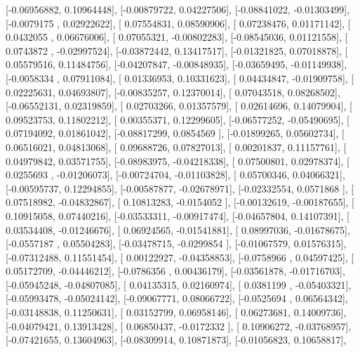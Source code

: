 \documentclass{article}
\begin{document}
       [-0.06956882,  0.10964448],
       [-0.00879722,  0.04227506],
       [-0.08841022, -0.01303499],
       [-0.0079175 ,  0.02922622],
       [ 0.07554831,  0.08590906],
       [ 0.07238476,  0.01171142],
       [ 0.0432055 ,  0.06676006],
       [ 0.07055321, -0.00802283],
       [-0.08545036,  0.01121558],
       [ 0.0743872 , -0.02997524],
       [-0.03872442,  0.13417517],
       [-0.01321825,  0.07018878],
       [ 0.05579516,  0.11484756],
       [-0.04207847, -0.00848935],
       [-0.03659495, -0.01149938],
       [-0.0058334 ,  0.07911084],
       [ 0.01336953,  0.10331623],
       [ 0.04434847, -0.01909758],
       [ 0.02225631,  0.04693807],
       [-0.00835257,  0.12370014],
       [ 0.07043518,  0.08268502],
       [-0.06552131,  0.02319859],
       [ 0.02703266,  0.01357579],
       [ 0.02614696,  0.14079904],
       [ 0.09523753,  0.11802212],
       [ 0.00355371,  0.12299605],
       [-0.06577252, -0.05490695],
       [ 0.07194092,  0.01861042],
       [-0.08817299,  0.0854569 ],
       [-0.01899265,  0.05602734],
       [ 0.06516021,  0.04813068],
       [ 0.09688726,  0.07827013],
       [ 0.00201837,  0.11157761],
       [ 0.04979842,  0.03571755],
       [-0.08983975, -0.04218338],
       [ 0.07500801,  0.02978374],
       [ 0.0255693 , -0.01206073],
       [-0.00724704, -0.01103828],
       [ 0.05700346,  0.04066321],
       [-0.00595737,  0.12294855],
       [-0.00587877, -0.02678971],
       [-0.02332554,  0.0571868 ],
       [ 0.07518982, -0.04832867],
       [ 0.10813283, -0.0154052 ],
       [-0.00132619, -0.00187655],
       [ 0.10915058,  0.07440216],
       [-0.03533311, -0.00917474],
       [-0.04657804,  0.14107391],
       [ 0.03534408, -0.01246676],
       [ 0.06924565, -0.01541881],
       [ 0.08997036, -0.01678675],
       [-0.0557187 ,  0.05504283],
       [-0.03478715, -0.0299854 ],
       [-0.01067579,  0.01576315],
       [-0.07312488,  0.11551454],
       [ 0.00122927, -0.04358853],
       [-0.0758966 ,  0.04597425],
       [ 0.05172709, -0.04446212],
       [-0.0786356 ,  0.00436179],
       [-0.03561878, -0.01716703],
       [-0.05945248, -0.04807085],
       [ 0.04135315,  0.02160974],
       [ 0.0381199 , -0.05403321],
       [-0.05993478, -0.05024142],
       [-0.09067771,  0.08066722],
       [-0.0525694 ,  0.06564342],
       [-0.03148838,  0.11250631],
       [ 0.03152799,  0.06958146],
       [ 0.06273681,  0.14009736],
       [-0.04079421,  0.13913428],
       [ 0.06850437, -0.0172332 ],
       [ 0.10906272, -0.03768957],
       [-0.07421655,  0.13604963],
       [-0.08309914,  0.10871873],
       [-0.01056823,  0.10658817],
\end{document}
